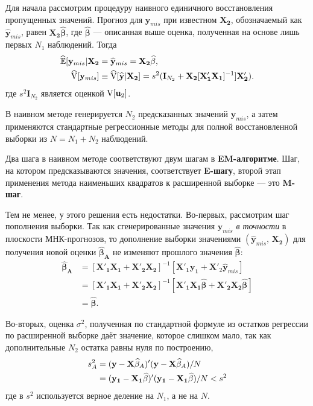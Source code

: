Для начала рассмотрим процедуру наивного единичного восстановления пропущенных значений. Прогноз для $\mathbf{y}_{mis}$ при известном $\mathbf{X_2}$, обозначаемый как $\widehat{\mathbf{y}}_{mis}$, равен $\mathbf{X_2} \widehat{\mathbf{\beta}}$, где $\widehat{\mathbf{\beta}}$ --- описанная выше оценка, полученная на основе лишь первых $N_1$ наблюдений. Тогда
\begin{align}
\widehat{\mathbb{E}}[\mathbf{y}_{mis}|\mathbf{X_2}&=\widehat{\mathbf{y}}_{mis}=\mathbf{X_2} \widehat{\mathbf{\beta}}, \\
\widehat{\mathrm{V}}[\mathbf{y}_{mis}]&\equiv \widehat{\mathrm{V}}[\widehat{\mathbf{y}}|\mathbf{X_2}]=s^2(\mathbf{I}_{N_2}+\mathbf{X_2}[\mathbf{X'_1 X_1}]^{-1}]\mathbf{X'_2}). \notag
\end{align}
где $s^2\mathbf{I}_{N_2}$ является оценкой $\mathrm{V}[\mathbf{u}_2]$.

В наивном методе генерируется $N_2$ предсказанных значений $\mathbf{y}_{mis}$, а затем применяются стандартные регрессионные методы для полной восстановленной выборки из $N=N_1+N_2$ наблюдений.

Два шага в наивном методе соответствуют двум шагам в {\bf EM-алгоритме}. Шаг, на котором предсказываются значения, соответствует {\bf E-шагу}, второй этап применения метода наименьших квадратов к расширенной выборке --- это {\bf M-шаг}.



Тем не менее, у этого решения есть недостатки. Во-первых, рассмотрим шаг пополнения выборки. Так как сгенерированные значения $\mathbf{y}_{mis}$ \emph{в точности} в плоскости МНК-прогнозов, то дополнение выборки значениями $(\widehat{\mathbf{y}}_{mis}, \, \mathbf{X_2})$ для получения новой оценки $\mathbf{\widehat{\beta}_A}$ не изменяют прошлого значения $\widehat{\mathbf{\beta}}$:
\begin{align*}
\mathbf{\widehat{\beta}_A}&= [\mathbf{X'_1 X_1}+\mathbf{X'_2 X_2}]^{-1}[\mathbf{X'_1 y_1}+\mathbf{X'}_2 \widehat{\mathbf{y}}_{mis}] \\
&=[\mathbf{X'_1 X_1}+\mathbf{X'_2 X_2}]^{-1}[\mathbf{X'_1 X_1}\widehat{\mathbf{\beta}}+\mathbf{X'_2 X_2}\widehat{\mathbf{\beta}}] \\
&= \widehat{\mathbf{\beta}}.
\end{align*}

Во-вторых, оценка $\sigma^2$, полученная по стандартной формуле из остатков регрессии по расширенной выборке даёт значение, которое слишком мало, так как дополнительные $N_2$ остатка равны нуля по построению,
\begin{align}
s^2_A &= (\mathbf{y-X}\widehat{\mathbf{\beta}}_A)'(\mathbf{y-X}\widehat{\mathbf{\beta}}_A)/N \\
&= (\mathbf{y_1-X_1}\widehat{\mathbf{\beta}})'(\mathbf{y_1-X_1}\widehat{\mathbf{\beta}})/N<s^2 \notag
\end{align}
где в $s^2$ используется верное деление на $N_1$, а не на $N$.

